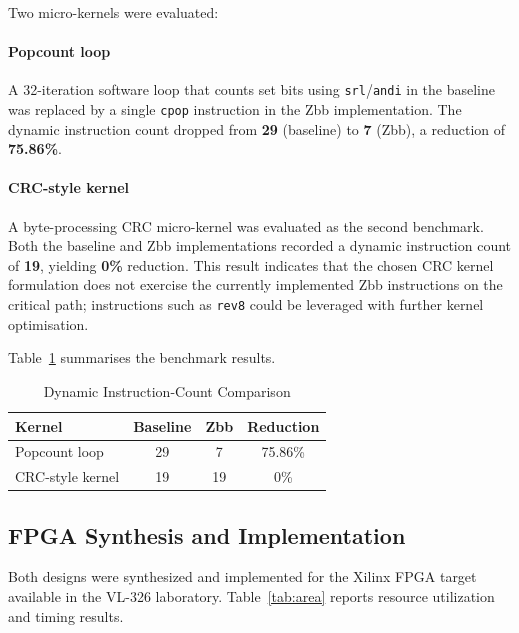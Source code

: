 \documentclass[conference]{IEEEtran}
\begin{document}
	Two micro-kernels were evaluated:
	
	\paragraph{Popcount loop}
	A 32-iteration software loop that counts set bits using \texttt{srl}/\texttt{andi}
	in the baseline was replaced by a single \texttt{cpop} instruction in the
	Zbb implementation.
	The dynamic instruction count dropped from \textbf{29} (baseline) to
	\textbf{7} (Zbb), a reduction of \textbf{75.86\%}.
	
	\paragraph{CRC-style kernel}
	A byte-processing CRC micro-kernel was evaluated as the second benchmark.
	Both the baseline and Zbb implementations recorded a dynamic instruction
	count of \textbf{19}, yielding \textbf{0\%} reduction.
	This result indicates that the chosen CRC kernel formulation does not
	exercise the currently implemented Zbb instructions on the critical path;
	instructions such as \texttt{rev8} could be leveraged with further kernel
	optimisation.
	
	Table~\ref{tab:benchmark} summarises the benchmark results.
	
	\begin{table}[h]
		\centering
		\caption{Dynamic Instruction-Count Comparison}
		\label{tab:benchmark}
		\begin{tabular}{lccc}
			\toprule
			\textbf{Kernel} & \textbf{Baseline} & \textbf{Zbb} & \textbf{Reduction} \\
			\midrule
			Popcount loop    & 29 & 7  & 75.86\% \\
			CRC-style kernel & 19 & 19 & 0\%     \\
			\bottomrule
		\end{tabular}
	\end{table}
	
	\subsection{FPGA Synthesis and Implementation}
	
	Both designs were synthesized and implemented for the Xilinx FPGA target
	available in the VL-326 laboratory.
	Table~\ref{tab:area} reports resource utilization and timing results.
	
\end{document}
